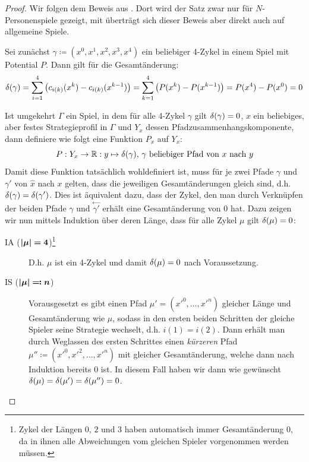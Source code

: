 \begin{proof}
	Wir folgen dem Beweis aus \cite[Anhang A]{MonShap}. Dort wird der Satz zwar nur für $N$-Personenspiele gezeigt, mit  überträgt sich dieser Beweis aber direkt auch auf allgemeine Spiele.
	
	Sei zunächst $\gamma \coloneqq (x^0, x^1, x^2, x^3, x^4)$ ein beliebiger 4-Zykel in einem Spiel mit Potential $P$. Dann gilt für die Gesamtänderung:
		\[\delta(\gamma) = \sum_{i=1}^4 \left(c_{i(k)}(x^k) - c_{i(k)}(x^{k-1})\right) = \sum_{k=1}^{4} \left(P(x^k) - P(x^{k-1})\right) = P(x^4) - P(x^0) = 0^{}\]
		
	Ist umgekehrt $\Gamma$ ein Spiel, in dem für alle 4-Zykel $\gamma$ gilt $\delta(\gamma) = 0$, $x$ ein beliebiges, aber festes Strategieprofil in $\Gamma$ und $Y_x$ dessen Pfadzusammenhangskomponente, dann definiere wie folgt eine Funktion $P_x$ auf $Y_x$:
		\[P: Y_x \to \mathbb{R}: y \mapsto \delta(\gamma), \,\gamma \text{ beliebiger Pfad von } x \text{ nach } y \]
	Damit diese Funktion tatsächlich wohldefiniert ist, muss für je zwei Pfade $\gamma$ und $\gamma'$ von $\hat{x}$ nach $x$ gelten, dass die jeweiligen Gesamtänderungen gleich sind, d.h. $\delta(\gamma) = \delta(\gamma')$. Dies ist äquivalent dazu, dass der Zykel, den man durch Verknüpfen der beiden Pfade $\gamma$ und $\overset{\leftarrow}{\gamma'}$ erhält eine Gesamtänderung von $0$ hat. Dazu zeigen wir nun mittels Induktion über deren Länge, dass für alle Zykel $\mu$ gilt $\delta(\mu) = 0$:
	\begin{description}
		\item[IA ($\bm{\left|\mu\right|=4}$)\footnote{Zykel der Längen $0$, $2$ und $3$ haben automatisch immer Gesamtänderung $0$, da in ihnen alle Abweichungen vom gleichen Spieler vorgenommen werden müssen.}] D.h. $\mu$ ist ein 4-Zykel und damit $\delta(\mu) = 0$ nach Voraussetzung.
		\item[IS ($\bm{\left|\mu\right|\eqqcolon n}$)] Vorausgesetzt es gibt einen Pfad $\mu' = (x'^0, \dots, x'^n)$ gleicher Länge und Gesamtänderung wie $\mu$, sodass in den ersten beiden Schritten der gleiche Spieler seine Strategie wechselt, d.h. $i(1)=i(2)$. Dann erhält man durch Weglassen des ersten Schrittes einen \emph{kürzeren} Pfad $\mu'' \coloneqq (x'^0, x'^2, \dots, x'^n)$ mit gleicher Gesamtänderung, welche dann nach Induktion bereits $0$ ist. In diesem Fall haben wir dann wie gewünscht $\delta(\mu) = \delta(\mu') = \delta(\mu'') = 0$.
		

\end{description}
\end{proof}
